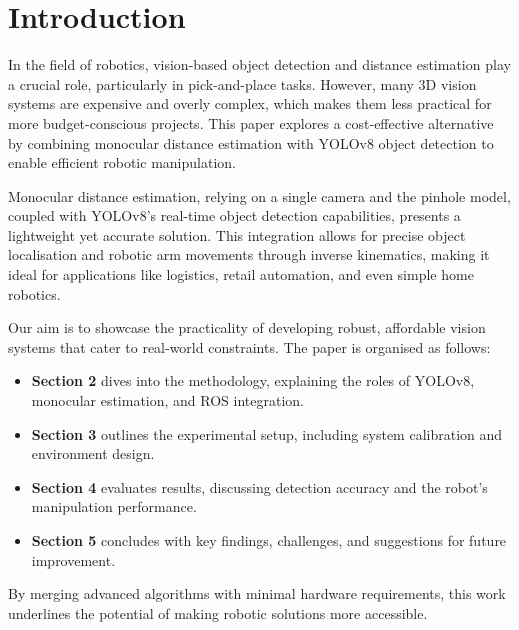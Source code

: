 \section{Introduction}

In the field of robotics, vision-based object detection and distance estimation play a crucial role, particularly in pick-and-place tasks. However, many 3D vision systems are expensive and overly complex, which makes them less practical for more budget-conscious projects. This paper explores a cost-effective alternative by combining monocular distance estimation with YOLOv8 object detection to enable efficient robotic manipulation.

Monocular distance estimation, relying on a single camera and the pinhole model, coupled with YOLOv8’s real-time object detection capabilities, presents a lightweight yet accurate solution. This integration allows for precise object localisation and robotic arm movements through inverse kinematics, making it ideal for applications like logistics, retail automation, and even simple home robotics.

Our aim is to showcase the practicality of developing robust, affordable vision systems that cater to real-world constraints. The paper is organised as follows:
\begin{itemize}
    \item \textbf{Section 2} dives into the methodology, explaining the roles of YOLOv8, monocular estimation, and ROS integration.
    \item \textbf{Section 3} outlines the experimental setup, including system calibration and environment design.
    \item \textbf{Section 4} evaluates results, discussing detection accuracy and the robot's manipulation performance.
    \item \textbf{Section 5} concludes with key findings, challenges, and suggestions for future improvement.
\end{itemize}

By merging advanced algorithms with minimal hardware requirements, this work underlines the potential of making robotic solutions more accessible.
